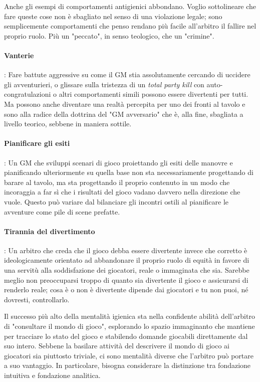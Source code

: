 
Anche gli esempi di comportamenti antigienici abbondano. Voglio sottolineare che fare queste cose non è sbagliato nel senso di una violazione legale; sono semplicemente comportamenti che penso rendano più facile all'arbitro il fallire nel proprio ruolo. Più un "peccato", in senso teologico, che un "crimine".

\paragraph{Vanterie}: Fare battute aggressive su come il GM stia assolutamente cercando di uccidere gli avventurieri, o glissare sulla tristezza di un \textit{total party kill} con auto-congratulazioni o altri comportamenti simili possono essere divertenti per tutti. Ma possono anche diventare una realtà percepita per uno dei fronti al tavolo e sono alla radice della dottrina del "GM avversario" che è, alla fine, sbagliata a livello teorico, sebbene in maniera sottile.

\paragraph{Pianificare gli esiti}: Un GM che sviluppi scenari di gioco proiettando gli esiti delle manovre e pianificando ulteriormente su quella base non sta necessariamente progettando di barare al tavolo, ma sta progettando il proprio contenuto in un modo che incoraggia a far sì che i risultati del gioco vadano davvero nella direzione che vuole. Questo può variare dal bilanciare gli incontri ostili al pianificare le avventure come pile di scene prefatte.

\paragraph{Tirannia del divertimento}: Un arbitro che creda che il gioco debba essere divertente invece che corretto è ideologicamente orientato ad abbandonare il proprio ruolo di equità in favore di una servitù alla soddisfazione dei giocatori, reale o immaginata che sia. Sarebbe meglio non preoccuparsi troppo di quanto sia divertente il gioco e assicurarsi di renderlo reale; cosa è o non è divertente dipende dai giocatori e tu non puoi, né dovresti, controllarlo.


Il successo più alto della mentalità igienica sta nella confidente abilità dell'arbitro di "consultare il mondo di gioco", esplorando lo spazio immaginanto che mantiene per tracciare lo stato del gioco e stabilendo domande giocabili direttamente dal suo intero. Sebbene la basilare attività del descrivere il mondo di gioco ai giocatori sia piuttosto triviale, ci sono mentalità diverse che l'arbitro può portare a suo vantaggio. In particolare, bisogna considerare la distinzione tra fondazione intuitiva e fondazione analitica.

